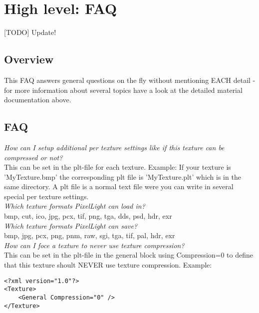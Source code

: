\chapter{High level: FAQ}


[TODO] Update!



\section{Overview}
This FAQ answers general questions on the fly without mentioning EACH detail - for more information
about several topics have a look at the detailed material documentation above.\\




\section{FAQ}


\emph{How can I setup additional per texture settings like if this texture can be compressed or not?}\\
This can be set in the plt-file for each texture. Example: If your texture is 'MyTexture.bmp' the
corresponding plt file is 'MyTexture.plt' which is in the same directory. A plt file is a normal
text file were you can write in several special per texture settings.\\


\emph{Which texture formats PixelLight can load in?}\\
bmp, cut, ico, jpg, pcx, tif, png, tga, dds, psd, hdr, exr\\


\emph{Which texture formats PixelLight can save?}\\
bmp, jpg, pcx, png, pnm, raw, sgi, tga, tif, pal, hdr, exr\\


\emph{How can I foce a texture to never use texture compression?}\\
This can be set in the plt-file in the general block using Compression=0 to define that this
texture shoult NEVER use texture compression. Example:\\

\begin{lstlisting}[caption=plt-file disable texture compression]
<?xml version="1.0"?>
<Texture>
	<General Compression="0" />
</Texture>
\end{lstlisting}

